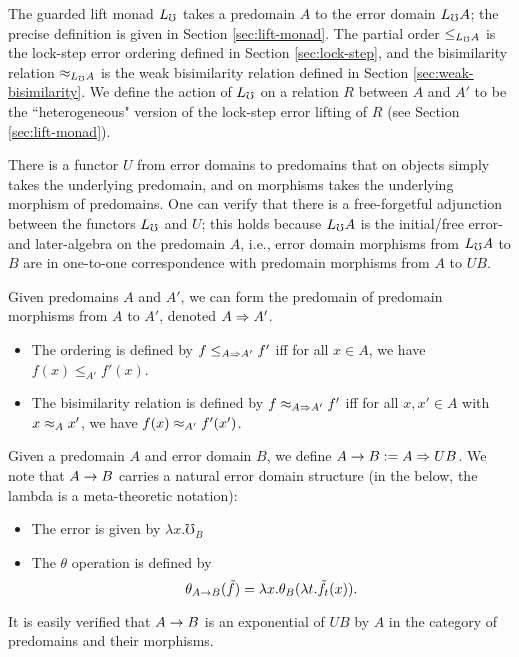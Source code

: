 The guarded lift monad $L_\mho$ takes a predomain $A$ to the error domain $L_\mho A$;
the precise definition is given in Section \ref{sec:lift-monad}.
The partial order $\le_{L_\mho A}$ is the lock-step error ordering defined in Section
\ref{sec:lock-step}, and the bisimilarity relation $\approx_{L_\mho A}$ is the weak bisimilarity
relation defined in Section \ref{sec:weak-bisimilarity}.
We define the action of $L_\mho$ on a relation $R$ between $A$ and $A'$ to be the
``heterogeneous" version of the lock-step error lifting of $R$ (see Section \ref{sec:lift-monad}).


There is a functor $U$ from error domains to predomains that on objects simply takes the
underlying predomain, and on morphisms takes the underlying morphism of predomains.
%
One can verify that there is a free-forgetful adjunction between the functors $L_\mho$ and $U$;
this holds because $L_\mho A$ is the initial/free error- and later-algebra on the predomain $A$,
i.e., error domain morphisms from $L_\mho A$ to $B$ are in one-to-one correspondence with
predomain morphisms from $A$ to $UB$.

Given predomains $A$ and $A'$, we can form the predomain of
predomain morphisms from $A$ to $A'$, denoted $A \Rightarrow A'$.
\begin{itemize}
    \item The ordering is defined by $f \le_{A \Rightarrow A'} f'$ iff for all
    $x \in A$, we have $f(x) \le_{A'} f'(x)$.
    \item The bisimilarity relation is defined by $f \approx_{A \Rightarrow A'} f'$ iff
    for all $x, x' \in A$ with $x \approx_{A} x'$, we have $f(x) \approx_{A'} f'(x')$. 
\end{itemize}

Given a predomain $A$ and error domain $B$, we define $A \to B := A \Rightarrow UB$.
We note that $A \to B$ carries a natural error domain structure
(in the below, the lambda is a meta-theoretic notation):
\begin{itemize}
    \item The error is given by $\lambda x . \mho_B$
    \item The $\theta$ operation is defined by
      \[ \theta_{A \to B}(\tilde{f}) = \lambda x . \theta_B(\lambda t . \tilde{f}_t(x)). \]
\end{itemize}

It is easily verified that $A \to B$ is an exponential of $UB$ by $A$
in the category of predomains and their morphisms.

